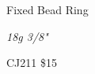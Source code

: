 \documentclass[8pt]{article}
\date{\today}
\title{}
\begin{document}
\begin{center}{\large{Fixed Bead Ring}}

\end{center}
\begin{center}{\Large\textit{18g 3/8"}}

\end{center}
\begin{center}{\large{CJ211\hspace{25mm}  \$15}}

\end{center}
\end{document}
